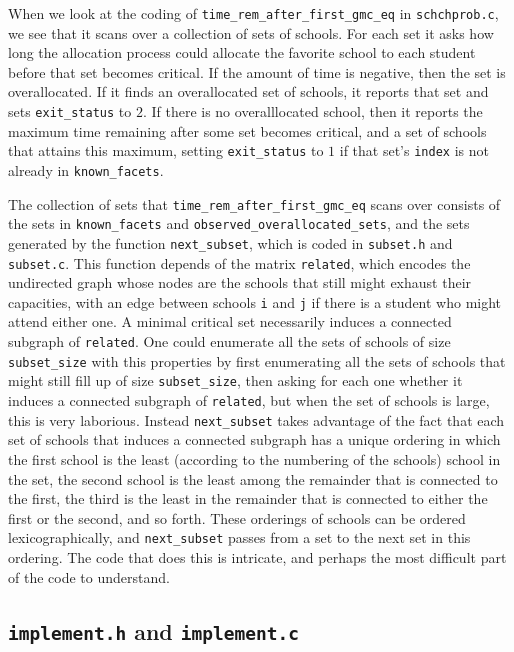 \documentclass[12pt]{article}
\theoremstyle{definition}
\begin{document}
\begin{appendix}
When we look at the coding of
\texttt{time\_rem\_after\_first\_gmc\_eq} in
\texttt{schchprob.c}, we see that it scans over a collection of sets
of schools. For each set it asks how long the allocation process could
allocate the favorite school to each student before that set becomes
critical.  If the amount of time is negative, then the set is
overallocated.  If it finds an overallocated set of schools, it
reports that set and sets \texttt{exit\_status} to $2$.  If there is
no overalllocated school, then it reports the maximum time remaining
after some set becomes critical, and a set of schools that attains
this maximum, setting \texttt{exit\_status} to $1$ if that set's
\texttt{index} is not already in \texttt{known\_facets}.

The collection of sets that \texttt{time\_rem\_after\_first\_gmc\_eq}
scans over consists of the sets in \texttt{known\_facets} and
\texttt{observed\_overallocated\_sets}, and the sets generated by the
function \texttt{next\_subset}, which is coded in \texttt{subset.h}
and \texttt{subset.c}.  This function depends of the matrix
\texttt{related}, which encodes the undirected graph whose nodes are
the schools that still might exhaust their capacities, with an edge
between schools \texttt{i} and \texttt{j} if there is a student who
might attend either one.  A minimal critical set necessarily induces a
connected subgraph of \texttt{related}.  One could enumerate all the
sets of schools of size \texttt{subset\_size} with this properties by
first enumerating all the sets of schools that might still fill up of
size \texttt{subset\_size}, then asking for each one whether it
induces a connected subgraph of \texttt{related}, but when the set of
schools is large, this is very laborious.  Instead
\texttt{next\_subset} takes advantage of the fact that each set of
schools that induces a connected subgraph has a unique ordering in
which the first school is the least (according to the numbering of the
schools) school in the set, the second school is the least among the
remainder that is connected to the first, the third is the least in
the remainder that is connected to either the first or the second, and
so forth.  These orderings of schools can be ordered
lexicographically, and \texttt{next\_subset} passes from a set to the
next set in this ordering.  The code that does this is intricate, and
perhaps the most difficult part of the code to understand.

\subsection{\texttt{implement.h} and \texttt{implement.c}}


\end{appendix}
\end{document}
